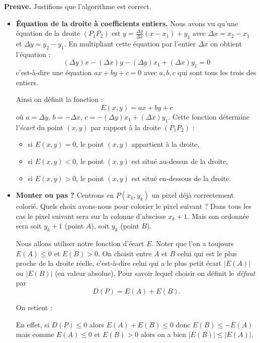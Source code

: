 \documentclass[11pt,class=report,crop=false]{standalone}
\begin{document}
\bigskip
\textbf{Preuve.}
Justifions que l'algorithme est correct.
\begin{itemize}
	\item \textbf{Équation de la droite à coefficients entiers.}
	Nous avons vu qu'une équation de la droite $(P_1P_2)$ est $y = \frac{\Delta y}{\Delta x} (x-x_1) + y_1$ avec $\Delta x =  x_2-x_1$ et $\Delta y = y_2 - y_1$. En multipliant cette équation par l'entier $\Delta x$ on obtient l'équation :
	$$(\Delta y) x - (\Delta x)y - (\Delta y)x_1 + (\Delta x) y_1 = 0$$
	c'est-à-dire une équation $ax+by+c=0$ avec $a,b,c$ qui sont tous les trois des entiers.
	
	Ainsi on définit la fonction :
	$$E(x,y)=ax+by+c$$
	où
	$a=\Delta y$, $b=-\Delta x$, $c=-(\Delta y)x_1 + (\Delta x) y_1 $.
	Cette fonction détermine l'\emph{écart} du point $(x,y)$ par rapport à la droite $(P_1P_2)$ :
	\begin{itemize}
		\item si $E(x,y)=0$, le point $(x,y)$ appartient à la droite,
		\item si $E(x,y)<0$, le point $(x,y)$ est situé au-dessus de la droite,		
		\item si $E(x,y)>0$, le point $(x,y)$ est situé en-dessous de la droite.
	\end{itemize}


	\item \textbf{Monter ou pas ?}
	Centrons en $P(x_k,y_k)$ un pixel déjà correctement colorié. Quels choix avons-nous pour colorier le pixel suivant ? Dans tous les cas le pixel suivant sera sur la colonne d'abscisse $x_k+1$. Mais son ordonnée sera soit $y_k+1$ (point $A$), soit $y_k$ (point $B$).
	
	\medskip

	

	Nous allons utiliser notre fonction d'écart $E$. Noter que l'on a toujours $E(A) \le 0$ et $E(B) > 0$. 	
	On choisit entre $A$ et $B$ celui qui est le plus proche de la droite réelle, c'est-à-dire celui qui a le plus petit écart $|E(A)|$ ou $|E(B)|$ (en valeur absolue).
	Pour savoir lequel choisir on définit le \emph{défaut} par 
	$$D(P) = E(A)+E(B).$$
	
	On retient :
	
	
	En effet, si $D(P) \le 0$ alors $E(A)+E(B) \le 0$ donc $E(B) \le -E(A)$ mais comme $E(A)\le0$ et $E(B)>0$ alors on a bien $|E(B)| \le |E(A)|$.


\end{itemize}
\end{document}
